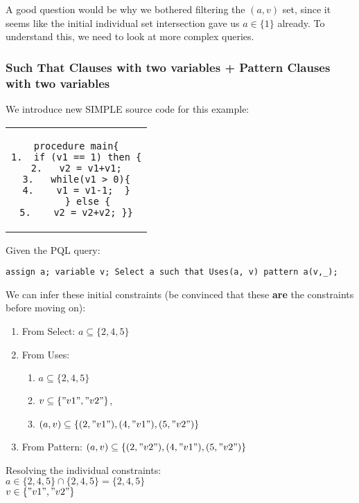 \documentclass{article}
\begin{document}
A good question would be why we bothered filtering the $(a, v)$ set, since it seems like the initial individual set intersection gave us $a \in \{1\}$ already. To understand this, we need to look at more complex queries. 

\subsubsection{Such That Clauses with two variables + Pattern Clauses with two variables}
We introduce new SIMPLE source code for this example: 

\begin{center}
\begin{tabular}{c}
\begin{lstlisting}
procedure main{
1.  if (v1 == 1) then {
2.   v2 = v1+v1;
3.   while(v1 > 0){
4.    v1 = v1-1;  }
    } else {
5.    v2 = v2+v2; }}
\end{lstlisting}
\end{tabular}
\end{center}

Given the PQL query: 
\begin{center}
\texttt{assign a; variable v; Select a such that Uses(a, v) pattern a(v,\_);}
\end{center}

We can infer these initial constraints (be convinced that these \textbf{are} the constraints before moving on):

\begin{enumerate}
    \item From Select: $a \subseteq \{2, 4, 5\}$
    \item From Uses: 
    \begin{enumerate}
        \item $a \subseteq \{2, 4, 5\}$
        \item $v \subseteq \{"v1", "v2"\}$, 
        \item $(a, v) \subseteq \{(2, "v1"), (4, "v1"), (5, "v2")\}$
    \end{enumerate}
    \item From Pattern: $(a, v) \subseteq \{(2, "v2"), (4, "v1"), (5, "v2")\}$
\end{enumerate}

Resolving the individual constraints: \\
$a \in  \{2, 4, 5\}\cap  \{2, 4, 5\}  = \{2, 4, 5\}$ \\
$v \in \{"v1", "v2"\}$\\
\end{document}
